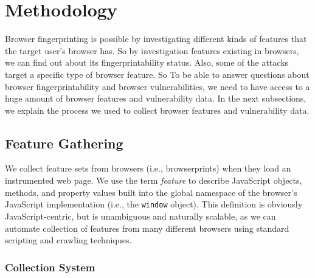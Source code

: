 \section{Methodology}
\label{sec:methodology}
Browser fingerprinting is possible by investigating different kinds of features that the target user's browser has. So by investigation features existing in browsers, we can find out about its fingerprintability status.  Also, some of the attacks target a specific type of browser feature. So To be able to answer questions about browser fingerprintability and browser vulnerabilities, we need to have access to a huge amount of browser features and vulnerability data. In the next subsections, we explain the process we used to collect browser features and vulnerability data.


\subsection{Feature Gathering}

We collect feature sets from browsers (i.e., browserprints) when they load an instrumented web page.
We use the term \textit{feature} to describe JavaScript objects, methods, and property values built into the global namespace of the browser's JavaScript implementation (i.e., the \texttt{window} object).
This definition is obviously JavaScript-centric, but is unambiguous and naturally scalable, as we can automate collection of features from many different browsers using standard scripting and crawling techniques.


\subsubsection{Collection System}

